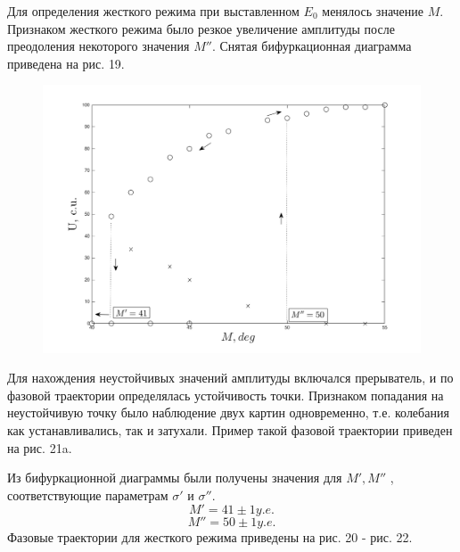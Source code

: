 Для определения жесткого режима при выставленном $E_0$ менялось значение $M$. Признаком жесткого режима было
 резкое увеличение амплитуды после преодоления некоторого значения $M''$.
Снятая бифуркационная диаграмма приведена на рис. 19.
\begin{center}
    \begin{figure}[H]
        \vspace{-10pt}
            \includegraphics[width=\linewidth]{graph/g2.png} 
            \vspace{-10pt}
            \label{fig:10}
            \vspace{-40pt}
    \end{figure}
\end{center} 
Для нахождения неустойчивых значений амплитуды включался прерыватель, и по фазовой траектории определялась устойчивость точки.
Признаком попадания на неустойчивую точку было наблюдение двух картин одновременно, т.е. колебания как устанавливались, так и затухали.
 Пример такой фазовой траектории приведен на рис. 21a.


 Из бифуркационной диаграммы были получены значения для $M',M''$ , соответствующие параметрам $\sigma'$ и $\sigma''$.
$$M'=  41 \pm 1 y.e.$$ $$M''= 50 \pm 1 y.e.$$
Фазовые траектории для жесткого режима приведены на рис. 20 - рис. 22.


